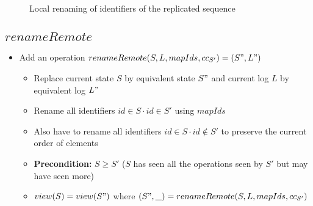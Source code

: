\documentclass[a4paper]{article}
\newcommand{\numToText}[1]{%
  \ifcase#1\or one\or two\or three\or four\or five\or six\or seven\or eight\or nine\or ten\or
    eleven\or twelve\or thirteen\or fourteen\or fifteen\or sixteen\or seventeen\or eighteen\or nineteen\or twenty\or Lots
  \fi
}
\newcommand{\drawState}[6] {
  \node[#2=1pt of #1] {#3};
  \node[#2=11pt of #1] {#4};
  \node[#2=30pt of #1] {#5};

  \def \logcontents{}
  \foreach[count=\counter] \remote/\local in {#6} {
    \xappto{\logcontents}{
      \noexpand
      \nodepart{\numToText{\counter}}
      $remoteOp_\remote$
    }
  }
  \node[#2=45pt of #1,
    scale=0.75,
    align=center,
    draw,
    rectangle split,
    rectangle split horizontal,
    rectangle split parts=\counter] {
    \logcontents
  };
}
\begin{document}
\begin{figure}[h]
  \caption{Local renaming of identifiers of the replicated sequence}
  \label{renameLocal}
\end{figure}

\subsection{$renameRemote$}

\begin{itemize}
  \item Add an operation $renameRemote(S, L, mapIds, cc_{S'}) = (S", L")$
  \begin{itemize}
    \item Replace current state $S$ by equivalent state $S"$ and current log $L$ by equivalent log $L"$
    \item Rename all identifiers $id \in S \cdot id \in S'$ using $mapIds$
    \item Also have to rename all identifiers $id \in S \cdot id \notin S'$ to preserve the current order of elements
    \item \textbf{Precondition: } $S \geq S'$ ($S$ has seen all the operations seen by $S'$ but may have seen more)
    \item $view(S) = view(S")$ where $(S", \_) = renameRemote(S, L, mapIds, cc_{S'})$
  \end{itemize}
\end{itemize}
\end{document}
